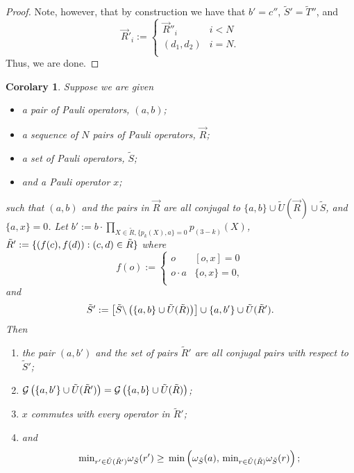 \documentclass[twocolumn,showpacs,preprintnumbers,amsmath,amssymb,nofootinbib,pra,floatfix]{revtex4-1}
\newtheorem{corolary}{Corolary}
\newcommand{\lst}{\vec}
\newcommand{\set}{\tilde}
\newcommand{\genfun}{\mathcal{G}}
\begin{document}
\begin{proof}
Note, however, that by construction we have that $b'=c''$, $\set S'=\set T''$, and
$$\lst R'_i :=
\begin{cases}
\lst R''_i & i < N \\
(d_1,d_2) & i = N.\\
\end{cases}
$$
Thus, we are done.
\end{proof}
\begin{corolary}
\label{recombination-to-make-commute}
Suppose we are given
\begin{itemize}
\item a pair of Pauli operators, $(a,b)$;
\item a sequence of $N$ pairs of Pauli operators, $\lst R$;
\item a set of Pauli operators, $\set S$;
\item and a Pauli operator $x$;
\end{itemize}
such that $(a,b)$ and the pairs in $\lst R$ are all conjugal to $\{a,b\}\cup\set U(\lst R)\cup\set S$, and $\{a,x\}=0$.  Let $b' := b\cdot \prod_{X\in\set R, \{p_k(X),a\}=0} p_{(3-k)}(X)$, $\set R':=\{\paren{f(c),f(d)}: (c,d)\in\set R\}$ where
$$
f(o) :=
\begin{cases}
o & [o,x]=0 \\
o\cdot a & \{o,x\}=0, \\
\end{cases}
$$
and
$$\set S' := \left[\set S\backslash\paren{\{a,b\} \cup \set U(\set R)}\right]\cup \{a,b'\} \cup \set U(\set R').$$
Then
\begin{enumerate}
\item the pair $(a,b')$ and the set of pairs $\set R'$ are all conjugal pairs with respect to $\set S'$;
\item $\genfun\paren{\{a,b'\}\cup \set U(\set R')}=\genfun\paren{\{a,b\}\cup \set U(\set R)}$;
\item $x$ commutes with every operator in $\set R'$;
\item and $$\min_{r'\in \set U(\set R')}\om_{\set S}(r')\ge \min\paren{\om_{\set S}(a),\min_{r\in \set U(\set R)}\om_{\set S}(r)};$$
\end{enumerate}
\end{corolary}
\end{document}
